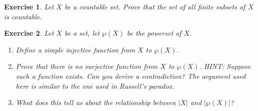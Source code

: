 \documentclass{article}
\theoremstyle{plain}
\newtheorem{Q}{Exercise}{\bfseries}{\upshape}
\newcommand{\bN}{\mathbb{N}}
\begin{document}
\begin{Q}
Let $X$ be a countable set. Prove that the set of all finite subsets of $X$ is countable. 
\end{Q}
\begin{comment}
\textbf{Solution:} 
Let $f:X\to \bN$ be injective. Arrange the prime numbers in a list as $p_0,p_1,\ldots$. We know from number theory that the set of primes is infinite, so this is a countably infinite list. Given $S=\{x_1,\ldots,x_n\}\subseteq X$, define $g(S)= p_{f(x_0)}\times p_{f(x_1)}\times\ldots\times p_{f(x_n)}$. Then $g$ is a function from the set of all finite subsets of $X$ to $\bN$. Moreover, $g$ is injective, because if $S_1\neq S_2$ then $g(S_1)$ and $g(S_2)$ will have different prime factorizations, and so we know from the Fundamental Theorem of Arithmetic that this means they must be different numbers.
\end{comment}

\begin{Q}\label{\prefix E:power}
Let $X$ be a set, let $\wp(X)$ be the powerset of $X$.
\begin{enumerate}
\item[a)] Define a simple injective function from $X$ to $\wp(X)$.
\item[b)] Prove that there is no surjective function from $X$ to $\wp(X)$. HINT: Suppose such a function exists. Can you derive a contradiction? The argument used here is similar to the one used in Russell's paradox. 
\item[c)] What does this tell us about the relationship between $|X|$ and $|\wp(X)|$?
\end{enumerate}
\end{Q}
\begin{comment}
\textbf{Solution:}
\begin{enumerate}[a)]
\item Use e.g. $x\mapsto \{x\}$.
\item Suppose $f:X\to \wp(X)$ is surjective. Let $Z=\{x\in X: x\notin f(x)\}$. Then, as $f$ is surjective, there is $z\in X$ with $f(z) = Z$. Suppose $z\in Z$. Then, by definition of $Z$ and $z$, we must have $z\notin Z$. On the other hand, if $z\notin Z$, then $z\in f(z)=Z$, which is also a contradiction. We conclude there can be no such surjective function.
\item We see that $|X|<|\wp(X)|$. In other words, $X$ is strictly smaller than $\wp(X)$.
\end{enumerate} 
\end{comment}
\end{document}
